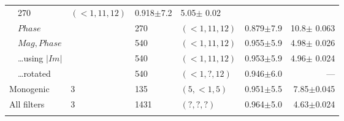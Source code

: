 \begin{tabularx}{\linewidth}{p{3cm} X X X X r r}
                                    &    270 & $({<}1, 11, 12)$   & 0.918$\pm$7.2     & 5.05$\pm$ 0.02 \\
        & $Phase$                   &&   270 & $({<}1, 11, 12)$   & 0.879$\pm$7.9     & 10.8$\pm$ 0.063 \\
        & $Mag,Phase$               &&   540 & $({<}1, 11, 12)$   & 0.955$\pm$5.9     & 4.98$\pm$ 0.026 \\
        & \ldots using $|Im|$       &&   540 & $({<}1, 11, 12)$   & 0.953$\pm$5.9     & 4.96$\pm$ 0.024 \\
        & \ldots rotated            &&   540 & $({<}1, ?, 12)$    & 0.946$\pm$6.0     & --- \\
\midrule
\multicolumn{2}{l}{Monogenic}       & \multirow{1}{1cm}{ 3 }
                                    &    135 &$(5, {<}1, 5)$      & 0.951$\pm$5.5     & 7.85$\pm$0.045 \\
\midrule
\multicolumn{2}{l}{All filters}     & \multirow{1}{1cm}{ 3 }
                                    &   1431 &$(?, ?, ?)$       & 0.964$\pm$5.0     & 4.63$\pm$0.024 \\                                    

\bottomrule
\noalign{\smallskip}
\end{tabularx}
